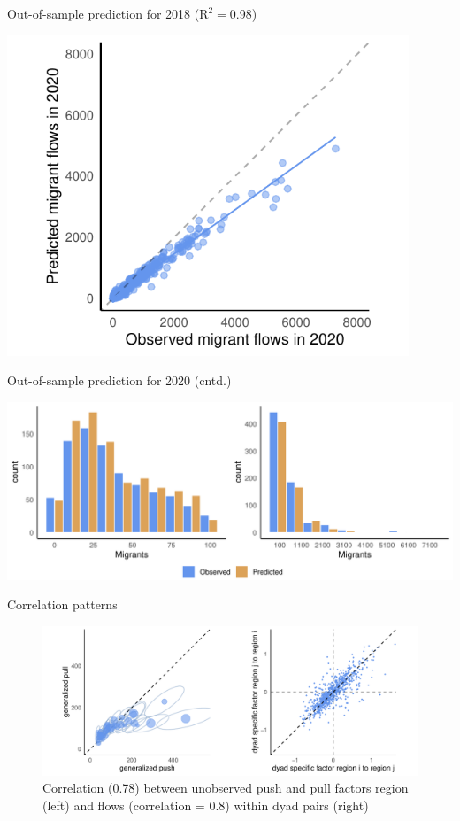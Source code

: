 \documentclass{beamer}
\begin{document}
\begin{frame}{Out-of-sample prediction for 2018 ($\text{R}^{2} = 0.98$)}
	\begin{center}
		\includegraphics[width=0.9\textwidth]{../../fig/prediction_2020}
	\end{center}
\end{frame}

\begin{frame}{Out-of-sample prediction for 2020 (cntd.)}
	\begin{center}
		\includegraphics[width=1\textwidth]{../../fig/hist_fit}
	\end{center}
\end{frame}

\begin{frame}{Correlation patterns}
	\begin{center}
		\begin{figure}
			\includegraphics[width=1\textwidth]{../../fig/country_dyad}
			\caption{Correlation (0.78) between unobserved push and pull factors region (left) and flows (correlation = 0.8) within dyad pairs (right)}
		\end{figure}

	\end{center}
\end{frame}
\end{document}
